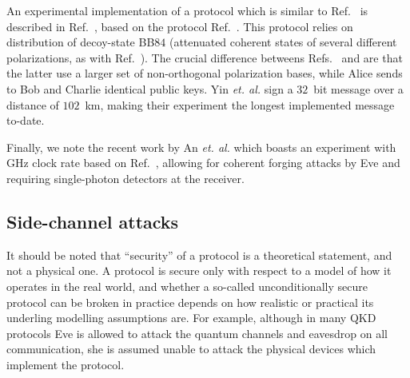 An experimental implementation of a protocol which is similar to Ref.~\cite{Amiri2016} is described in Ref.~\cite{Yin2017c}, based on the protocol Ref.~\cite{Yin2016}. This protocol relies on distribution of decoy-state BB$84$ (attenuated coherent states of several different polarizations, as with Ref.~\cite{Amiri2016}). The crucial difference betweens Refs.~\cite{Amiri2016} and \cite{Yin2016, Yin2017c} are that the latter use a larger set of non-orthogonal polarization bases, while Alice sends to Bob and Charlie identical public keys. %
Yin \emph{et. al.} \cite{Yin2017c} sign a $32$~bit message over a distance of $102$~km, making their experiment the longest implemented message to-date.

Finally, we note the recent work by An \emph{et. al.} \cite{An2019} which boasts an experiment with GHz clock rate based on Ref.~\cite{Amiri2016}, allowing for coherent forging attacks by Eve and requiring single-photon detectors at the receiver.


\subsection{Side-channel attacks}
It should be noted that ``security'' of a protocol is a theoretical statement, and not a physical one. A protocol is secure only with respect to a model of how it operates in the real world, and whether a so-called unconditionally secure protocol can be broken in practice depends on how realistic or practical its underling modelling assumptions are. For example, although in many QKD protocols Eve is allowed to attack the quantum channels and eavesdrop on all communication, she is assumed unable to attack the physical devices which implement the protocol. 

